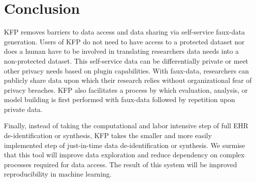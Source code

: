 \documentclass{article}
\begin{document}
\section{Conclusion}

KFP removes barriers to data access and data sharing via self-service faux-data generation. Users of KFP do not need to have access to a protected dataset nor does a human have to be involved in translating researchers data needs into a non-protected dataset. This self-service data can be differentially private or meet other privacy needs based on plugin capabilities. With faux-data, researchers can publicly share data upon which their research relies without organizational fear of privacy breaches. KFP also facilitates a process by which evaluation, analysis, or model building is first performed with faux-data followed by repetition upon private data. 

Finally, instead of taking the computational and labor intensive step of full EHR de-identification or synthesis, KFP takes the smaller and more easily implemented step of just-in-time data de-identification or synthesis. We surmise that this tool will improve data exploration and reduce dependency on complex processes required for data access. The result of this system will be improved reproducibility in machine learning.




\end{document}
